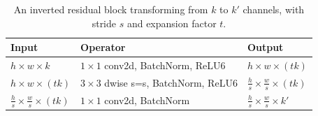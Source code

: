 \begin{table} %
\begin{center}

\begin{tabular}{l|l|l}
\textbf{Input} & \textbf{Operator} & \textbf{Output}\\
\hline
$h \times w \times k$ & $1 \times 1$ conv2d, BatchNorm, ReLU6 & $h \times w \times (tk)$\\
$h \times w \times (tk)$ & $3 \times 3$ dwise s=s, BatchNorm, ReLU6 & $\frac{h}{s} \times \frac{w}{s} \times (tk)$ \\
$\frac{h}{s} \times \frac{w}{s} \times (tk)$ & $1 \times 1$ conv2d, BatchNorm & $\frac{h}{s} \times \frac{w}{s} \times k'$
\end{tabular}

\caption{An inverted residual block transforming from $k$ to $k'$ channels, with stride $s$ and expansion factor $t$.}
\label{tab:invres_expansion}
\end{center}
\end{table}

